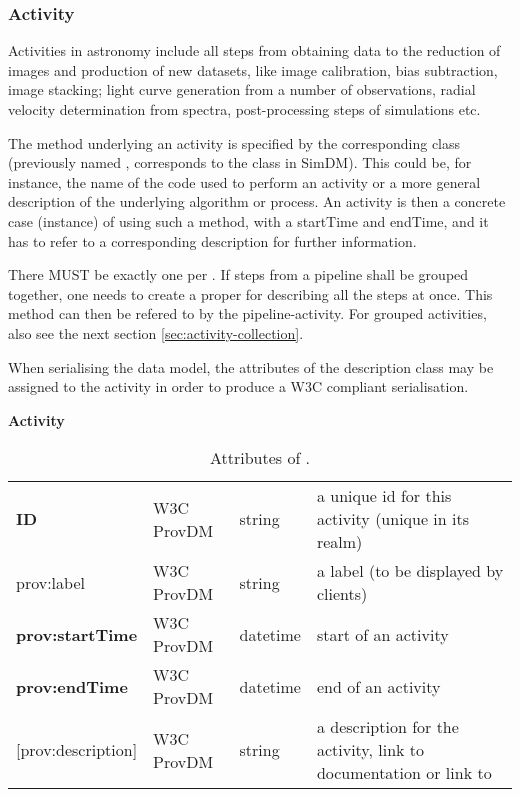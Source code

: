 \subsubsection{Activity}
Activities in astronomy include all steps from obtaining data to the reduction of 
images and production of new datasets, like image calibration, bias subtraction, image stacking; 
light curve generation from a number of observations, radial velocity 
determination from spectra, post-processing steps of simulations etc.

The method underlying an activity is specified by the corresponding 
 class (previously named , corresponds 
to the  class in SimDM). This could be, 
for instance, the name of the code used to perform an activity or a more general 
description of the underlying algorithm or process. An activity is then a 
concrete case (instance) of using such a method, with a startTime and endTime, 
and it has to refer to a corresponding description for further information.

There MUST be exactly one  per . If steps from a 
pipeline shall be grouped together, one needs to create a proper 
 for describing all the steps at once. This method can then 
be refered to by the pipeline-activity. For grouped activities, also see the 
next section \ref{sec:activity-collection}.

When serialising the data model, the attributes
of the description class may be assigned to the activity in order to produce 
a W3C compliant serialisation.

\begin{table}[h]

\small
{}\textwidth

\textbf{\normalsize Activity}\vspace{0.25em}\\
\begin{tabulary}{1.0\textwidth}{@{}lp{2.5cm}lL@{}}
\toprule
{} &  &  & \\
\midrule
\textbf{ID} & W3C ProvDM  & string & a unique id for this activity (unique in its realm)\\
prov:label        & W3C ProvDM  & string & a label (to be displayed by clients)\\
\textbf{prov:startTime} & W3C ProvDM  & datetime & start of an activity\\
\textbf{prov:endTime} & W3C ProvDM  & datetime & end of an activity\\
{[prov:description]}  & W3C ProvDM & string & a description for the activity, 
				link to documentation or link to \\
\bottomrule
\end{tabulary}
\caption{Attributes of .}
\end{table}

